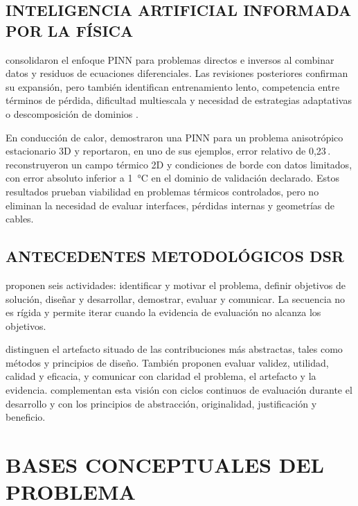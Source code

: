 \documentclass[11pt,a4paper,oneside]{report}
\newcommand{\pct}{\mbox{\char37}}
\begin{document}
\subsection{INTELIGENCIA ARTIFICIAL INFORMADA POR LA FÍSICA}

\textcite[686--690]{raissi2019} consolidaron el enfoque PINN para problemas directos e inversos al combinar datos y residuos de ecuaciones diferenciales. Las revisiones posteriores confirman su expansión, pero también identifican entrenamiento lento, competencia entre términos de pérdida, dificultad multiescala y necesidad de estrategias adaptativas o descomposición de dominios \parencites[1--2,14--17]{lawal2022}[2--6]{ren2025}.

En conducción de calor, \textcite[1,3,17]{xing2023} demostraron una PINN para un problema anisotrópico estacionario 3D y reportaron, en uno de sus ejemplos, error relativo de 0,23\,\pct. \textcite[1,3,16]{pan2025} reconstruyeron un campo térmico 2D y condiciones de borde con datos limitados, con error absoluto inferior a \SI{1}{\celsius} en el dominio de validación declarado. Estos resultados prueban viabilidad en problemas térmicos controlados, pero no eliminan la necesidad de evaluar interfaces, pérdidas internas y geometrías de cables.

\subsection{ANTECEDENTES METODOLÓGICOS DSR}

\textcite[54--56]{peffers2007} proponen seis actividades: identificar y motivar el problema, definir objetivos de solución, diseñar y desarrollar, demostrar, evaluar y comunicar. La secuencia no es rígida y permite iterar cuando la evidencia de evaluación no alcanza los objetivos.

\textcite[342--350]{gregor2013} distinguen el artefacto situado de las contribuciones más abstractas, tales como métodos y principios de diseño. También proponen evaluar validez, utilidad, calidad y eficacia, y comunicar con claridad el problema, el artefacto y la evidencia. \textcite[198--203]{delport2024} complementan esta visión con ciclos continuos de evaluación durante el desarrollo y con los principios de abstracción, originalidad, justificación y beneficio.

\section{BASES CONCEPTUALES DEL PROBLEMA}
\label{sec:bases-conceptuales}
\end{document}
